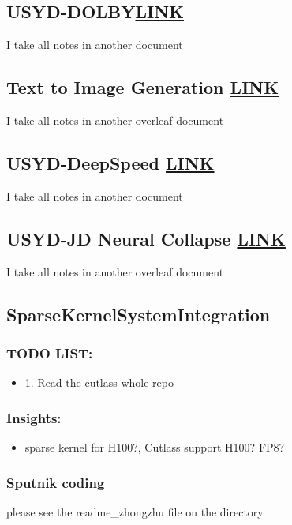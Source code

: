 \documentclass[8pt,UTF8]{article}
\begin{document}
    \subsection{USYD-DOLBY\href{https://www.overleaf.com/project/66393ea7c6f2ac174e243747}{LINK}}
        I take all notes in another document
    \subsection{Text to Image Generation \href{https://www.overleaf.com/project/62be53a76e943de3e5a1345e}{LINK}}
        I take all notes in another overleaf document
    \subsection{USYD-DeepSpeed \href{https://www.overleaf.com/project/63ef6aa2e74b0423bc40ec89}{LINK}}
        I take all notes in another document

    \subsection{USYD-JD Neural Collapse \href{https://www.overleaf.com/project/625c5095f632585a029dc5fd}{LINK}}
        I take all notes in another overleaf document
    \subsection{SparseKernelSystemIntegration}
        \subsubsection{TODO LIST:}
            \begin{itemize}
                \item 1. Read the cutlass whole repo
            \end{itemize}
        \subsubsection{Insights:}
            \begin{itemize}
                \item sparse kernel for H100?, Cutlass support H100? FP8?
            \end{itemize}
        \subsubsection{Sputnik coding}
            please see the readme\_zhongzhu file on the directory
\end{document}
